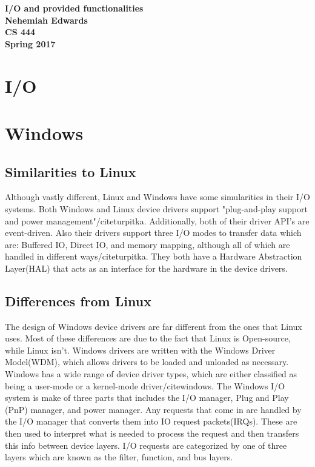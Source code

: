\documentclass[letterpaper,10pt,draftclsnofoot,onecolumn, titlepage]{IEEEtran}
\begin{document}
\begin{titlepage}
	\begin{center}
	\vspace*{3.5cm}
	\textbf{I/O and provided functionalities\\
	Nehemiah Edwards\\
	CS 444\\
	Spring 2017}
	\vfill
	\end{center}
\end{titlepage}

\newpage

\section{I/O}
\section{Windows}
\subsection{Similarities to Linux}
Although vastly different, Linux and Windows have some simularities in their I/O systems. Both Windows and Linux device drivers support "plug-and-play support and power management"/cite{turpitka}. Additionally, both of their driver API's are event-driven. Also their drivers support three I/O modes to transfer data which are: Buffered IO, Direct IO, and memory mapping, although all of which are handled in different ways/cite{turpitka}. They both have a Hardware Abstraction Layer(HAL) that acts as an interface for the hardware in the device drivers\cite{turpitka}.
\subsection{Differences from Linux}
The design of Windows device drivers are far different from the ones that Linux uses. Most of these differences are due to the fact that Linux is Open-source, while Linux isn't. Windows drivers are written with the Windows Driver Model(WDM), which allows drivers to be loaded and unloaded as necessary\cite{turpitka}. Windows has a wide range of device driver types, which are either classified as being a user-mode or a kernel-mode driver/cite{windows}. The Windows I/O system is make of three parts that includes the I/O manager, Plug and Play (PnP) manager, and power manager\cite{windows}. Any requests that come in are handled by the I/O manager that converts them into IO request packets(IRQs)\cite{turpitka}. These are then used to interpret what is needed to process the request and then transfers this info between device layers. I/O requests are categorized by one of three layers which are known as the filter, function, and bus layers.
\end{document}
